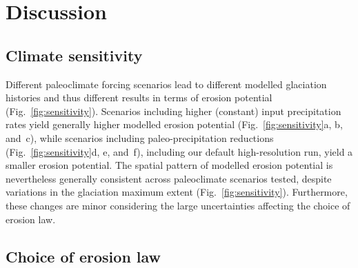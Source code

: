 \documentclass[utf8]{article}
\begin{document}
\section{Discussion}

\subsection{Climate sensitivity}
\label{sec:sensitivity}

    Different paleoclimate forcing scenarios lead to different modelled
    glaciation histories and thus different results in terms of erosion
    potential (Fig.~\ref{fig:sensitivity}). Scenarios including higher
    (constant) input precipitation rates yield generally higher modelled
    erosion potential (Fig.~\ref{fig:sensitivity}a, b, and~c), while scenarios
    including paleo-precipitation reductions (Fig.~\ref{fig:sensitivity}d, e,
    and~f), including our default high-resolution run, yield a smaller erosion
    potential. The spatial pattern of modelled erosion potential is
    nevertheless generally consistent across paleoclimate scenarios tested,
    despite variations in the glaciation maximum extent
    (Fig.~\ref{fig:sensitivity}). Furthermore, these changes are minor
    considering the large uncertainties affecting the choice of erosion law.

\subsection{Choice of erosion law}
\label{sec:powerlaws}
\end{document}
